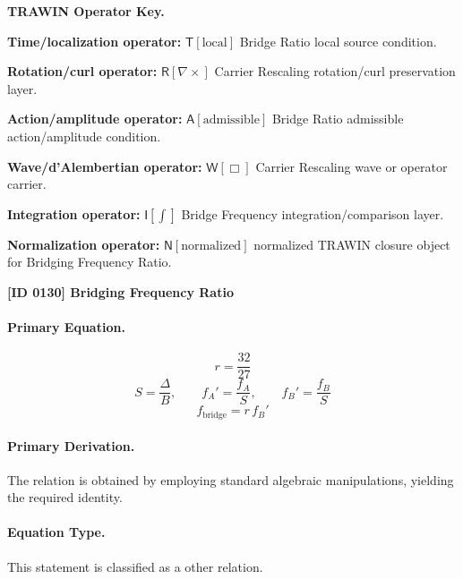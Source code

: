 \par\vspace{0.45\baselineskip}
\noindent\begin{minipage}[t]{\linewidth}
\begingroup
\small
\raggedright
\textbf{TRAWIN Operator Key.}\par
\noindent\textbf{Time/localization operator:} $\mathsf{T}\!\left[\mathrm{local}\right]$ Bridge Ratio local source condition.\par
\noindent\textbf{Rotation/curl operator:} $\mathsf{R}\!\left[\nabla\times\right]$ Carrier Rescaling rotation/curl preservation layer.\par
\noindent\textbf{Action/amplitude operator:} $\mathsf{A}\!\left[\mathrm{admissible}\right]$ Bridge Ratio admissible action/amplitude condition.\par
\noindent\textbf{Wave/d'Alembertian operator:} $\mathsf{W}\!\left[\Box\right]$ Carrier Rescaling wave or operator carrier.\par
\noindent\textbf{Integration operator:} $\mathsf{I}\!\left[\int\right]$ Bridge Frequency integration/comparison layer.\par
\noindent\textbf{Normalization operator:} $\mathsf{N}\!\left[\mathrm{normalized}\right]$ normalized TRAWIN closure object for Bridging Frequency Ratio.\par
\endgroup
\end{minipage}

\clearpage
\noindent\textbf{[ID 0130] Bridging Frequency Ratio}\par
\vspace{0.35em}
\paragraph{Primary Equation.}
\[
r = \frac{32}{27}
\]
\[
S = \frac{\Delta}{B},
\qquad
f_A' = \frac{f_A}{S},
\qquad
f_B' = \frac{f_B}{S}
\]
\[
f_{\mathrm{bridge}} = r\,f_B'
\]

\paragraph{Primary Derivation.}
The relation is obtained by employing standard algebraic manipulations, yielding the required identity.
\paragraph{Equation Type.}
This statement is classified as a other relation.

